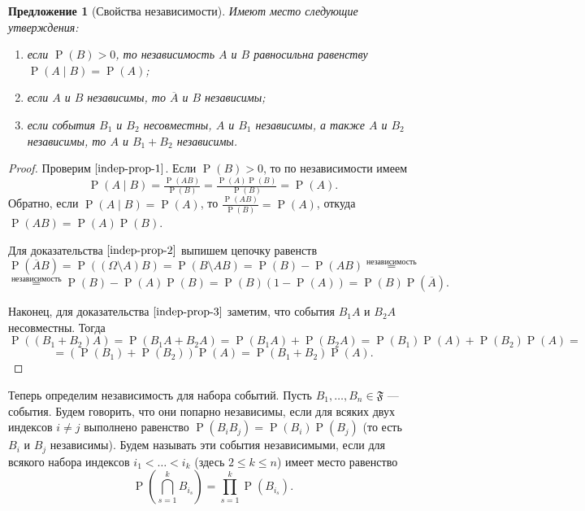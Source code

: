 \documentclass[12pt]{article}
\newtheorem{proposition}[theorem]{Предложение}
\numberwithin{theorem}{section}
\theoremstyle{definition}
\newcommand{\defin}[2]{\hypertarget{#2}{{\color{red} #1}}}
\newcommand{\prob}{\operatorname{P}}
\newcommand{\events}{\mathfrak{F}}
\begin{document}
	\begin{proposition}[Свойства независимости] \label{indep-prop}
		Имеют место следующие утверждения:
		\begin{enumerate}
			\item если $ \prob(B) > 0 $, 
			то независимость $ A $ и $ B $ равносильна равенству $ \prob(A \mid B) = \prob(A) $; \label{indep-prop-1}
			\item если $ A $ и $ B $ независимы, то $ \overline{A} $ и $ B $ независимы; \label{indep-prop-2}
			\item если события $ B_1 $ и $ B_2 $ несовместны, $ A $ и $ B_1 $ независимы, а также $ A $ и $ B_2 $ независимы, 
			то $ A $ и $ B_1 + B_2 $ независимы. \label{indep-prop-3}
		\end{enumerate}
	\end{proposition}
	
	\begin{proof}
		Проверим $ \ref{indep-prop-1} $.
		Если $ \prob(B) > 0 $, то по независимости имеем 
		$$ \prob(A \mid B) = \tfrac{\prob(AB)}{\prob(B)} = \tfrac{\prob(A)\prob(B)}{\prob(B)} = \prob(A). $$
		Обратно, если $ \prob(A \mid B) = \prob(A) $, то $ \tfrac{\prob(AB)}{\prob(B)} = \prob(A) $, откуда
		$ \prob(AB) = \prob(A)\prob(B) $.
		
		Для доказательства $ \ref{indep-prop-2} $ выпишем цепочку равенств
		$$ \prob(\overline{A}B) = \prob((\Omega \setminus A)B) = \prob(B \setminus AB) 
		= \prob(B) - \prob(AB) \overset{\text{независимость}}{=} $$ 
		$$ \overset{\text{независимость}}{=} \prob(B) - \prob(A)\prob(B) = \prob(B)(1 - \prob(A)) = \prob(B)\prob(\overline{A}). $$
		
		Наконец, для доказательства $ \ref{indep-prop-3} $ заметим, что события $ B_1A $ и $ B_2A $ несовместны.
		Тогда
		$$ \prob((B_1 + B_2)A) = \prob(B_1A + B_2A) = \prob(B_1A) + \prob(B_2A) 
		= \prob(B_1)\prob(A) + \prob(B_2)\prob(A)= $$ 
		$$ = (\prob(B_1) + \prob(B_2))\prob(A) = \prob(B_1 + B_2)\prob(A). $$
	\end{proof}

	Теперь определим независимость для набора событий.
	Пусть $ B_1, \ldots, B_n \in \events $ --- события.
	Будем говорить, что они \defin{попарно независимы}{pairwise-independent}, если для всяких двух индексов $ i \neq j $ выполнено равенство
	$ \prob(B_iB_j) = \prob(B_i)\prob(B_j) $ (то есть $ B_i $ и $ B_j $ независимы). 
	Будем называть эти события \defin{независимыми}{global-independent}, если для всякого набора индексов
	$ i_1 < \ldots < i_k $ (здесь $ 2 \leqslant k \leqslant n $) имеет место равенство
	$$ \prob\left(\bigcap\limits_{s = 1}^{k} B_{i_s}\right) = \prod_{s = 1}^{k} \prob(B_{i_s}). $$
	
\end{document}
